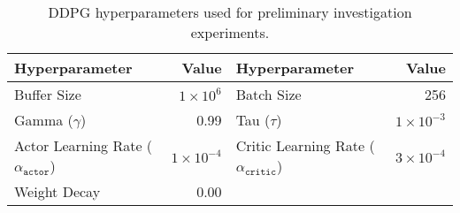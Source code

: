 \begin{table}[h]
	\centering
	\caption{DDPG hyperparameters used for preliminary investigation experiments.}
	\begin{tabular}{lrlr}
	\toprule
	\textbf{Hyperparameter} & \textbf{Value} & \textbf{Hyperparameter} & \textbf{Value} \\
	\midrule
	Buffer Size 	 & $1 \times 10^6$  & Batch Size 	& 256 \\
	Gamma ($\gamma$) & 0.99 	& Tau ($\tau$) 	& $1 \times 10^{-3}$ \\
	Actor Learning Rate ($\alpha_{\texttt{actor}}$) & $1 \times 10^{-4}$ & Critic Learning Rate ($\alpha_{\texttt{critic}}$) & $3 \times 10^{-4} $ \\
	Weight Decay & 0.00 & & \\
	\bottomrule
	\end{tabular}\label{tab:5000_hyperparameters}
\end{table}



















\clearpage


















